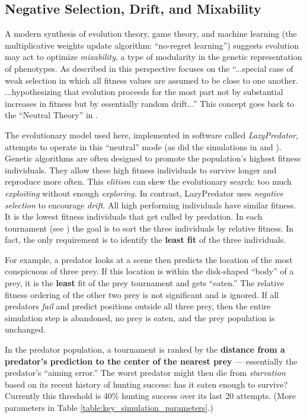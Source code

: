 \documentclass[letterpaper]{article}
\newcommand{\jargon}[1]{\textit{#1}}
\newcommand{\lazypredator}[0]{LazyPredator}
\begin{document}
\subsection{Negative Selection, Drift, and Mixability}

A modern synthesis \cite{livnat_sex_2016} of evolution theory, game theory, and machine learning (the multiplicative weights update algorithm: “no-regret learning”) suggests evolution may act to optimize \jargon{mixability}, a type of modularity in the genetic representation of phenotypes. As described in \citet{chastain_multiplicative_2013} this perspective focuses on the “...special case of weak selection in which all fitness values are assumed to be close to one another. ...hypothesizing that evolution proceeds for the most part not by substantial increases in fitness but by essentially random drift...” This concept goes back to the “Neutral Theory” in \citet{kimura_evolutionary_1968}.
\par
The evolutionary model used here, implemented in software called \jargon{\lazypredator{},} attempts to operate in this “neutral” mode (as did the simulations in \citet{reynolds_iec_2011} and \citet{harrington_coevolution_2014}). Genetic algorithms are often designed to promote the population's highest fitness individuals. They allow these high fitness individuals to survive longer and reproduce more often. This \jargon{elitism} can skew the evolutionary search: too much \jargon{exploiting} without enough \jargon{exploring.}  In contrast, \lazypredator{} uses \textit{negative selection} to encourage \jargon{drift}. All high performing individuals have similar fitness. It is the lowest fitness individuals that get culled by predation. In each tournament (see ) the goal is to sort the three individuals by relative fitness. In fact, the only requirement is to identify the \textbf{least fit} of the three individuals.
\par 
For example, a predator looks at a scene then predicts the location of the most conspicuous of three prey. If this location is within the disk-shaped “body” of a prey, it is the \textbf{least} fit of the prey tournament and gets “eaten.” The relative fitness ordering of the other two prey is not significant and is ignored. If all predators \jargon{fail} and predict positions outside all three prey, then the entire simulation step is abandoned, no prey is eaten, and the prey population is unchanged.
\par
In the predator population, a tournament is ranked by the \textbf{distance from a predator's prediction to the center of the nearest prey} — essentially the predator's “aiming error.” The worst predator might then die from \jargon{starvation} based on its recent history of hunting success: has it eaten enough to survive? Currently this threshold is 40\% hunting success over its last 20 attempts. (More parameters in Table \ref{table:key_simulation_parameters}.)
\end{document}
